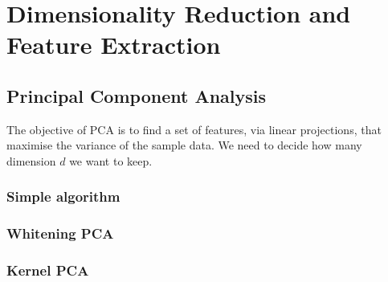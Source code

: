 \chapter{Dimensionality Reduction and Feature Extraction} %
\label{cha:dimensionality_reduction}

\section{Principal Component Analysis} %
	\label{sec:principal_component_analysis}
	
	The objective of PCA is to find a set of features, via linear projections, that maximise the variance of the sample data. We need to decide how many dimension $d$ we want to keep. 
 
	\subsection{Simple algorithm} %
		\label{sub:simple_algorithm}
	

	\subsection{Whitening PCA} %
		\label{sub:whitening_pca}
	

	\subsection{Kernel PCA} %
		\label{sub:kernel_pca}
	
	
